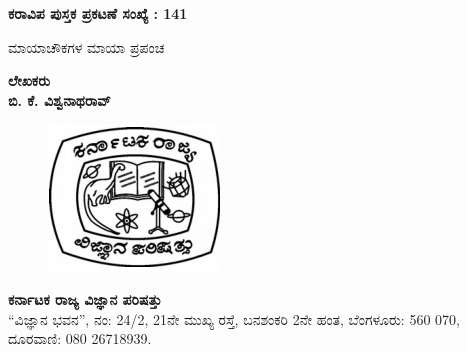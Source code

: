 
\hfill{\bfseries ಕರಾವಿಪ ಪುಸ್ತಕ ಪ್ರಕಟಣೆ ಸಂಖ್ಯೆ : {\rm 141}}

\vfill 

\thispagestyle{empty}
\begin{center}
{\fontsize{30}{32}\selectfont ಮಾಯಾಚೌಕಗಳ ಮಾಯಾ ಪ್ರಪಂಚ}
\vfill


{\Large\bfseries ಲೇಖಕರು}\\[4pt]
{\LARGE\bfseries ಬಿ. ಕೆ. ವಿಶ್ವನಾಥರಾವ್}\\[4pt]
\vfill

\begin{figure}[H]
\centering
\includegraphics[scale=.7]{logo.eps}
\end{figure}

{\Large\bfseries ಕರ್ನಾಟಕ ರಾಜ್ಯ ವಿಜ್ಞಾನ ಪರಿಷತ್ತು}\\
“ವಿಜ್ಞಾನ ಭವನ”, ನಂ: {\rm 24/2}, {\rm 21}ನೇ ಮುಖ್ಯ ರಸ್ತೆ, ಬನಶಂಕರಿ {\rm 2}ನೇ ಹಂತ, ಬೆಂಗಳೂರು: {\rm 560 070},\\
ದೂರವಾಣಿ: {\rm 080 26718939.}

\end{center}
\newpage
